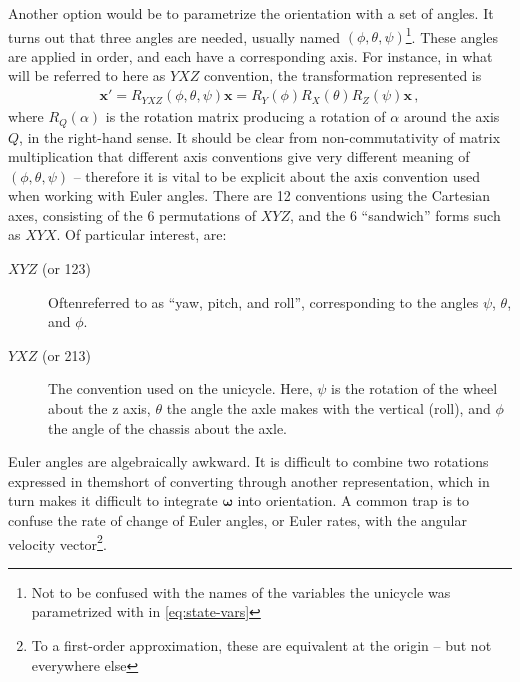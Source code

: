 \documentclass[main.tex]{subfiles}
\begin{document}
	Another option would be to parametrize the orientation with a set of angles.
	It turns out that three angles are needed, usually named $(\phi, \theta, \psi)$\footnote{Not to be confused with the names of the variables the unicycle was parametrized with in \cref{eq:state-vars}}.
	These angles are applied in order, and each have a corresponding axis. For instance, in what will be referred to here as $YXZ$ convention\footnotemark, the transformation represented is
	\begin{align}
		\bm{x}' = R_{YXZ}(\phi, \theta, \psi)\bm{x} = R_Y(\phi)R_X(\theta)R_Z(\psi) \bm{x}\,,
		\label{eq:euler-matrix}
	\end{align}
	where $R_Q(\alpha)$ is the rotation matrix producing a rotation of $\alpha$ around the axis $Q$, in the right-hand sense.
	It should be clear from non-commutativity of matrix multiplication that different axis conventions give very different meaning of $(\phi, \theta, \psi)$ -- therefore it is vital to be explicit about the axis convention used when working with Euler angles.
	There are 12 conventions using the Cartesian axes, consisting of the 6 permutations of $XYZ$, and the 6 \enquote{sandwich} forms such as $XYX$. Of particular interest, are:
	\begin{description}
		\item[$XYZ$ (or 123)]
			Often\footnotemark referred to as \enquote{yaw, pitch, and roll}, corresponding to the angles $\psi$, $\theta$, and $\phi$.
		\item[$YXZ$ (or 213)]
			The convention used on the unicycle. Here, $\psi$ is the rotation of the wheel about the z axis, $\theta$ the angle the axle makes with the vertical (roll), and $\phi$ the angle of the chassis about the axle.
	\end{description}
	Euler angles are algebraically awkward. It is difficult to combine two rotations expressed in them\footnotemark short of converting through another representation, which in turn makes it difficult to integrate $\bm{\omega}$ into orientation.
	A common trap is to confuse the rate of change of Euler angles, or Euler rates, with the angular velocity vector\footnote{To a first-order approximation, these are equivalent at the origin -- but not everywhere else}.
\end{document}
